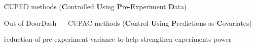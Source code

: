 \r{CUPED methods (\textbf{C}ontrolled \textbf{U}sing \textbf{P}re-\textbf{E}xperiment \textbf{D}ata)\cite{deng2013improving}}

\r{Out of DoorDash --- CUPAC methods (\textbf{C}ontrol \textbf{U}sing \textbf{P}redictions as \textbf{C}ovariates)\cite{tangcontrol}}

\r{reduction of pre-experiment variance to help strengthen experiments power}

